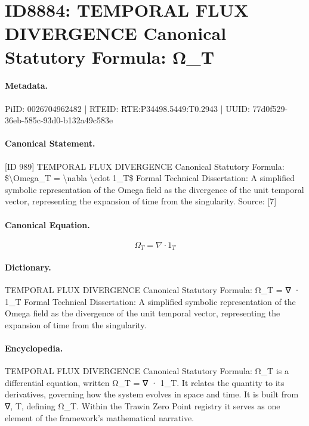 \section*{ID8884: TEMPORAL FLUX DIVERGENCE Canonical Statutory Formula: Ω\_T}
\paragraph{Metadata.}
PiID: 0026704962482 | RTEID: RTE:P34498.5449:T0.2943 | UUID: 77d0f529-36eb-585c-93d0-b132a49c583e

\paragraph{Canonical Statement.}
[ID 989] TEMPORAL FLUX DIVERGENCE Canonical Statutory Formula: \$\textbackslash{}Omega\_T = \textbackslash{}nabla \textbackslash{}cdot 1\_T\$ Formal Technical Dissertation: A simplified symbolic representation of the Omega field as the divergence of the unit temporal vector, representing the expansion of time from the singularity. Source: [7]

\paragraph{Canonical Equation.}
\[
\Omega_T = \nabla \cdot 1_T
\]

\paragraph{Dictionary.}
TEMPORAL FLUX DIVERGENCE Canonical Statutory Formula: Ω\_T = ∇ · 1\_T Formal Technical Dissertation: A simplified symbolic representation of the Omega field as the divergence of the unit temporal vector, representing the expansion of time from the singularity.

\paragraph{Encyclopedia.}
TEMPORAL FLUX DIVERGENCE Canonical Statutory Formula: Ω\_T is a differential equation, written Ω\_T = ∇ · 1\_T. It relates the quantity to its derivatives, governing how the system evolves in space and time. It is built from ∇, T, defining Ω\_T. Within the Trawin Zero Point registry it serves as one element of the framework's mathematical narrative.
